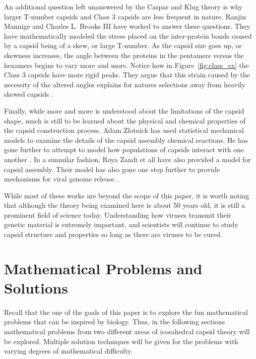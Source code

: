 \documentclass[12pt,letter]{article}
\begin{document}
An additional question left unanswered by the Caspar and Klug theory is why larger T-number capsids and Class 3 capsids are less frequent in nature. Ranjin Mannige and Charles L. Brooks III have worked to answer these questions. They have mathematically modeled the stress placed on the inter-protein bonds caused by a capsid being of a skew, or large T-number. As the capsid size goes up, or skewness increases, the angle between the proteins in the pentamers versus the hexamers begins to vary more and more. Notice how in Figure~\ref{fig:class_ex} the Class 3 capsids have more rigid peaks. They argue that this strain caused by the necessity of the altered angles explains for natures selections away from heavily skewed capsids \cite{Mannige:2009}.

Finally, while more and more is understood about the limitations of the capsid shape, much is still to be learned about the physical and chemical properties of the capsid construction process. Adam Zlotnick has used statistical mechanical models to examine the details of the capsid assembly chemical reactions. He has gone further to attempt to model how populations of capsids interact with one another \cite{Zlotnick:2005}. In a simmilar fashion, Roya Zandi et all have also provided a model for capsid assembly. Their model has also gone one step further to provide mechanisms for viral genome release \cite{Zandi:2004}.

While most of these works are beyond the scope of this paper, it is worth noting that although the theory being examined here is about 50 years old, it is still a prominent field of science today. Understanding how viruses transmit their genetic material is extremely important, and scientists will continue to study capsid structure and properties so long as there are viruses to be cured.

\section{Mathematical Problems and Solutions} %
\paragraph{}
Recall that the one of the goals of this paper is to explore the fun mathematical problems that can be inspired by biology. Thus, in the following sections mathematical problems from two different areas of icosahedral capsid theory will be explored. Multiple solution techniques will be given for the problems with varying degrees of mathematical difficulty.
\end{document}
